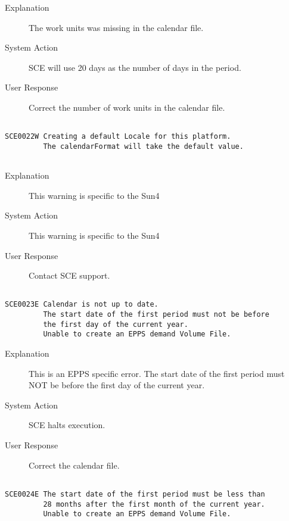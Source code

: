 \begin{description}
\item[Explanation]  The work units was missing in the calendar file.

\item[System Action]  SCE will use 20 days as the number of days in the period.

\item[User Response]  Correct the number of work units in the calendar file.
\end{description}
\hrulefill
\begin{verbatim}

SCE0022W Creating a default Locale for this platform.
         The calendarFormat will take the default value.
         
\end{verbatim}
\begin{description}
\item[Explanation]  This warning is specific to the Sun4 

\item[System Action]  This warning is specific to the Sun4

\item[User Response]  Contact SCE support.
\end{description}
\hrulefill
\begin{verbatim}

SCE0023E Calendar is not up to date.
         The start date of the first period must not be before
         the first day of the current year.
         Unable to create an EPPS demand Volume File.
\end{verbatim}
\begin{description}
\item[Explanation]  This is an EPPS specific error.
The start date of the first period must NOT be before
 the first day of the current year.

\item[System Action]  SCE halts execution.

\item[User Response]  Correct the calendar file.
\end{description}
\hrulefill
\begin{verbatim}

SCE0024E The start date of the first period must be less than
         28 months after the first month of the current year.
         Unable to create an EPPS demand Volume File.
\end{verbatim}
